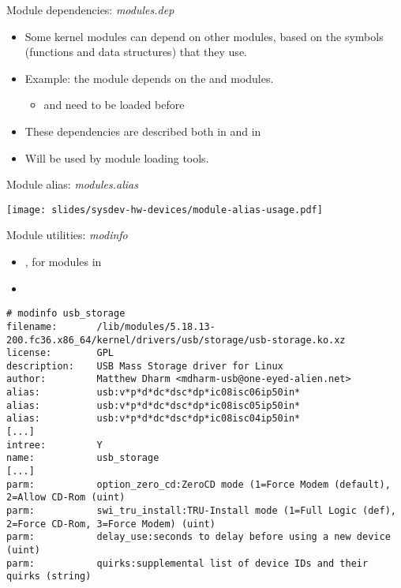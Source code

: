 \begin{frame}{Module dependencies: {\em modules.dep}}
  \begin{itemize}
  \item Some kernel modules can depend on other modules, based on the
    symbols (functions and data structures) that they use.
  \item Example: the  module depends on the  and
     modules.
    \begin{itemize}
    \item {} and  need to be loaded before 
    \end{itemize}
  \item These dependencies are described both in
     and in
  \item Will be used by module loading tools.
  \end{itemize}
\end{frame}

\begin{frame}{Module alias: {\em modules.alias}}
  \begin{center}
    \texttt{[image: slides/sysdev-hw-devices/module-alias-usage.pdf]}
  \end{center}
\end{frame}

\begin{frame}[fragile]{Module utilities: {\em modinfo}}
  \begin{itemize}
  \item {}, for modules in 
  \item {}
  \end{itemize}

  \begin{block}{}
    {\tiny
\begin{verbatim}
# modinfo usb_storage
filename:       /lib/modules/5.18.13-200.fc36.x86_64/kernel/drivers/usb/storage/usb-storage.ko.xz
license:        GPL
description:    USB Mass Storage driver for Linux
author:         Matthew Dharm <mdharm-usb@one-eyed-alien.net>
alias:          usb:v*p*d*dc*dsc*dp*ic08isc06ip50in*
alias:          usb:v*p*d*dc*dsc*dp*ic08isc05ip50in*
alias:          usb:v*p*d*dc*dsc*dp*ic08isc04ip50in*
[...]
intree:         Y
name:           usb_storage
[...]
parm:           option_zero_cd:ZeroCD mode (1=Force Modem (default), 2=Allow CD-Rom (uint)
parm:           swi_tru_install:TRU-Install mode (1=Full Logic (def), 2=Force CD-Rom, 3=Force Modem) (uint)
parm:           delay_use:seconds to delay before using a new device (uint)
parm:           quirks:supplemental list of device IDs and their quirks (string)
\end{verbatim}
    }
  \end{block}
\end{frame}

